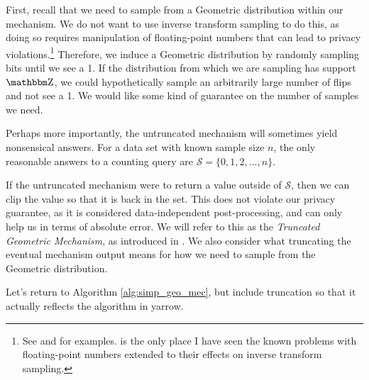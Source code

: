 \documentclass[11pt]{scrartcl} %
\begin{document}
First, recall that we need to sample from a Geometric distribution within our mechanism.
We do not want to use inverse transform sampling to do this, as doing so requires manipulation
of floating-point numbers that can lead to privacy violations.\footnote{See \cite{Mir12} and
\cite{Ilv19} for examples. \cite{BV17} is the only place I have seen the known problems
with floating-point numbers extended to their effects on inverse transform sampling.}
Therefore, we induce a Geometric distribution by randomly sampling bits until we
see a 1. If the distribution from which we are sampling has support $\Z$, we could hypothetically
sample an arbitrarily large number of flips and not see a 1. We would like some kind of guarantee
on the number of samples we need. \newline

Perhaps more importantly, the untruncated mechanism will sometimes yield nonsensical answers.
For a data set with known sample size $n$, the only reasonable answers to a counting query
are $\mathcal{S} = \{0,1,2,\hdots,n\}$. \newline

If the untruncated mechanism were to return a value
outside of $\mathcal{S}$, then we can clip the value so that it is back in the set.
This does not violate our privacy guarantee, as it is considered data-independent post-processing, and
can only help us in terms of absolute error. We will refer to this as the
\emph{Truncated Geometric Mechanism}, as introduced in \cite{GRS12}.
We also consider what truncating the eventual mechanism output means for how we need
to sample from the Geometric distribution. \newline

Let's return to Algorithm \ref{alg:simp_geo_mec}, but include truncation so that it
actually reflects the algorithm in yarrow. \newline
\end{document}
